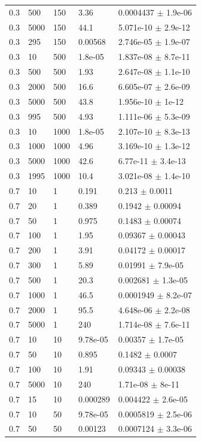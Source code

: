 \begin{longtable}{lllll}
	0.3 & 500 & 150 & 3.36 & 0.0004437 $\pm$ 1.9e-06 \\
	0.3 & 5000 & 150 & 44.1 & 5.071e-10 $\pm$ 2.9e-12 \\
	0.3 & 295 & 150 & 0.00568 & 2.746e-05 $\pm$ 1.9e-07 \\
	0.3 & 10 & 500 & 1.8e-05 & 1.837e-08 $\pm$ 8.7e-11 \\
	0.3 & 500 & 500 & 1.93 & 2.647e-08 $\pm$ 1.1e-10 \\
	0.3 & 2000 & 500 & 16.6 & 6.605e-07 $\pm$ 2.6e-09 \\
	0.3 & 5000 & 500 & 43.8 & 1.956e-10 $\pm$ 1e-12 \\
	0.3 & 995 & 500 & 4.93 & 1.111e-06 $\pm$ 5.3e-09 \\
	0.3 & 10 & 1000 & 1.8e-05 & 2.107e-10 $\pm$ 8.3e-13 \\
	0.3 & 1000 & 1000 & 4.96 & 3.169e-10 $\pm$ 1.3e-12 \\
	0.3 & 5000 & 1000 & 42.6 & 6.77e-11 $\pm$ 3.4e-13 \\
	0.3 & 1995 & 1000 & 10.4 & 3.021e-08 $\pm$ 1.4e-10 \\
	0.7 & 10 & 1 & 0.191 & 0.213 $\pm$ 0.0011 \\
	0.7 & 20 & 1 & 0.389 & 0.1942 $\pm$ 0.00094 \\
	0.7 & 50 & 1 & 0.975 & 0.1483 $\pm$ 0.00074 \\
	0.7 & 100 & 1 & 1.95 & 0.09367 $\pm$ 0.00043 \\
	0.7 & 200 & 1 & 3.91 & 0.04172 $\pm$ 0.00017 \\
	0.7 & 300 & 1 & 5.89 & 0.01991 $\pm$ 7.9e-05 \\
	0.7 & 500 & 1 & 20.3 & 0.002681 $\pm$ 1.3e-05 \\
	0.7 & 1000 & 1 & 46.5 & 0.0001949 $\pm$ 8.2e-07 \\
	0.7 & 2000 & 1 & 95.5 & 4.648e-06 $\pm$ 2.2e-08 \\
	0.7 & 5000 & 1 & 240 & 1.714e-08 $\pm$ 7.6e-11 \\
	0.7 & 10 & 10 & 9.78e-05 & 0.00357 $\pm$ 1.7e-05 \\
	0.7 & 50 & 10 & 0.895 & 0.1482 $\pm$ 0.0007 \\
	0.7 & 100 & 10 & 1.91 & 0.09343 $\pm$ 0.00038 \\
	0.7 & 5000 & 10 & 240 & 1.71e-08 $\pm$ 8e-11 \\
	0.7 & 15 & 10 & 0.000289 & 0.004422 $\pm$ 2.6e-05 \\
	0.7 & 10 & 50 & 9.78e-05 & 0.0005819 $\pm$ 2.5e-06 \\
	0.7 & 50 & 50 & 0.00123 & 0.0007124 $\pm$ 3.3e-06 \\

\end{longtable}
